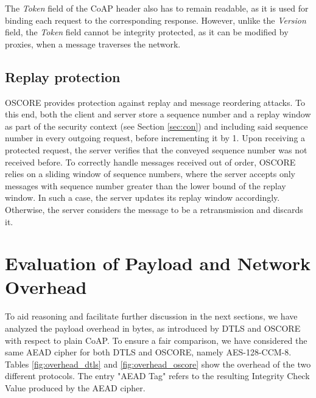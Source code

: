 {The \emph{Token} field of the CoAP header also has to remain readable, as it is used for binding each request to the corresponding response. However, unlike the \emph{Version} field, the \emph{Token} field cannot be integrity protected, as it can be modified by proxies, when a message traverses the network.

\subsection{Replay protection}
\label{sec:repl}
OSCORE provides protection against replay and message reordering attacks. To this end, both the client and server store a sequence number and a replay window as part of the security context (see Section \ref{sec:con}) and including said sequence number in every outgoing request, before incrementing it by 1. Upon receiving a protected request, the server verifies that the conveyed sequence number was not received before. To correctly handle messages received out of order, OSCORE relies on a sliding window of sequence numbers, where the server accepts only messages with sequence number greater than the lower bound of the replay window. In such a case, the server updates its replay window accordingly. Otherwise, the server considers the message to be a retransmission and discards it.

\section{Evaluation of Payload and Network Overhead}
\label{s:payloadoverhead}
To aid reasoning and facilitate further discussion in the next sections, we have analyzed the payload overhead in bytes, as introduced by DTLS and OSCORE with respect to plain CoAP. To ensure a fair comparison, we have considered the same AEAD cipher for both DTLS and OSCORE, namely AES-128-CCM-8. Tables \ref{fig:overhead_dtls} and \ref{fig:overhead_oscore} show the overhead of the two different protocols. The entry "AEAD Tag" refers to the resulting Integrity Check Value produced by the AEAD cipher.

\begin{table}[h]


\end{table}}
